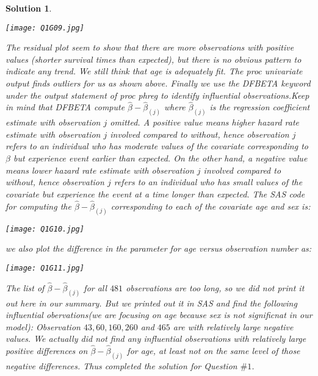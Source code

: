 \documentclass[11pt]{article}
\newtheorem{sol}{Solution}
\begin{document}
\begin{sol}
	\begin{center}
		\texttt{[image: Q1G09.jpg]}
	\end{center}
	The residual plot seem to show that there are more observations with positive values (shorter survival times than expected), but there is no obvious pattern to indicate any trend. We still think that age is adequately fit.\vskip 2mm
	The proc univariate output finds outliers for us as shown above.\vskip 2mm
	Finally we use the DFBETA keyword under the output statement of proc phreg to identify influential observations.Keep in mind that DFBETA compute $\hat{\beta} - \hat{\beta}_{(j)}$ where $\hat{\beta}_{(j)}$ is the regression coefficient estimate with observation $j$ omitted. A positive value means higher hazard rate estimate with observation $j$ involved compared to without, hence observation $j$ refers to an individual who has moderate values of the covariate corresponding to $\beta$ but experience event earlier than expected. On the other hand, a negative value means lower hazard rate estimate with observation $j$ involved compared to without, hence observation $j$ refers to an individual who has small values of the covariate but experience the event at a time longer than expected.\vskip 2mm
	The SAS code for computing the $\hat{\beta} - \hat{\beta}_{(j)}$ corresponding to each of the covariate age and sex is:
	\begin{center}
		\texttt{[image: Q1G10.jpg]}
	\end{center}
	we also plot the difference in the parameter for age versus observation number as:
	\begin{center}
		\texttt{[image: Q1G11.jpg]}
	\end{center}
	The list of $\hat{\beta} - \hat{\beta}_{(j)}$ for all $481$ observations are too long, so we did not print it out here in our summary. But we printed out it in SAS and find the following influential obervations(we are focusing on age because sex is not significnat in our model):\vskip 2mm
	Observation $43, 60, 160, 260$ and $465$ are with relatively large negative values.\vskip 2mm
	We actually did not find any influential observations with relatively large positive differences on $\hat{\beta} - \hat{\beta}_{(j)}$ for age, at least not on the same level of those negative differences.\vskip 2mm
	Thus completed the solution for Question $\# 1$.
\end{sol}
\end{document}
